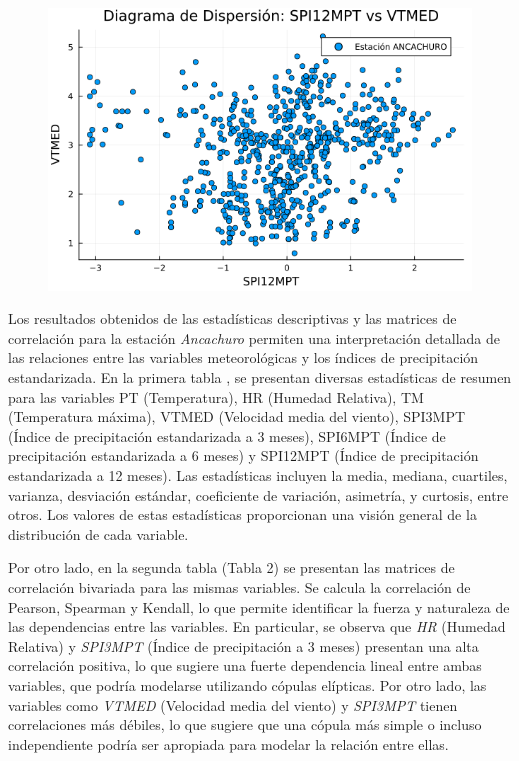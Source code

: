 \begin{figure}[htbp]
\begin{minipage}{0.32\textwidth}
    \includegraphics[width=\linewidth]{Capitulos/Scaterplot/ANCACHURO_SPI12MPT_vs_VTMED.png}
\end{minipage}

\end{figure}



Los resultados obtenidos de las estadísticas descriptivas y las matrices de correlación para la estación \textit{Ancachuro} permiten una interpretación detallada de las relaciones entre las variables meteorológicas y los índices de precipitación estandarizada. En la primera tabla , se presentan diversas estadísticas de resumen para las variables PT (Temperatura), HR (Humedad Relativa), TM (Temperatura máxima), VTMED (Velocidad media del viento), SPI3MPT (Índice de precipitación estandarizada a 3 meses), SPI6MPT (Índice de precipitación estandarizada a 6 meses) y SPI12MPT (Índice de precipitación estandarizada a 12 meses). Las estadísticas incluyen la media, mediana, cuartiles, varianza, desviación estándar, coeficiente de variación, asimetría, y curtosis, entre otros. Los valores de estas estadísticas proporcionan una visión general de la distribución de cada variable.

Por otro lado, en la segunda tabla (Tabla 2) se presentan las matrices de correlación bivariada para las mismas variables. Se calcula la correlación de Pearson, Spearman y Kendall, lo que permite identificar la fuerza y naturaleza de las dependencias entre las variables. En particular, se observa que \textit{HR} (Humedad Relativa) y \textit{SPI3MPT} (Índice de precipitación a 3 meses) presentan una alta correlación positiva, lo que sugiere una fuerte dependencia lineal entre ambas variables, que podría modelarse utilizando cópulas elípticas. Por otro lado, las variables como \textit{VTMED} (Velocidad media del viento) y \textit{SPI3MPT} tienen correlaciones más débiles, lo que sugiere que una cópula más simple o incluso independiente podría ser apropiada para modelar la relación entre ellas.


